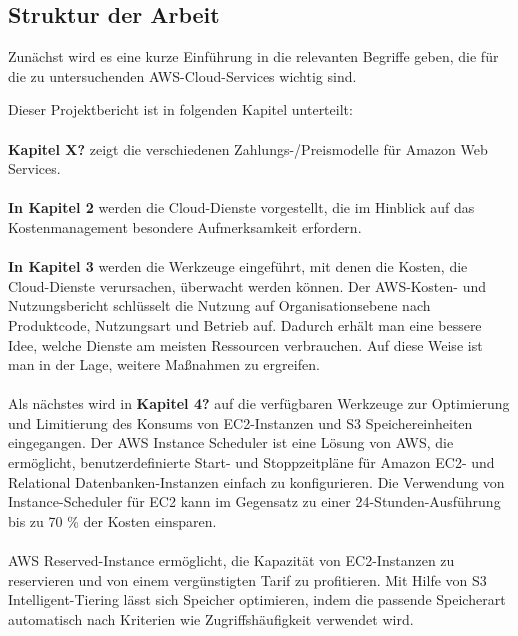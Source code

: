 \subsection{Struktur der Arbeit}
Zunächst wird es eine kurze Einführung in die relevanten Begriffe geben, die für die zu untersuchenden AWS-Cloud-Services wichtig sind.

Dieser Projektbericht ist in folgenden Kapitel unterteilt:\\\\
\textbf{Kapitel X?} 
zeigt die verschiedenen Zahlungs-/Preismodelle für Amazon Web Services. 
\\\\
\textbf{In Kapitel 2} werden die Cloud-Dienste vorgestellt, die im Hinblick auf das Kostenmanagement besondere Aufmerksamkeit erfordern.
\\\\
\textbf{In Kapitel 3} werden die Werkzeuge eingeführt, mit denen die Kosten, die Cloud-Dienste verursachen, überwacht werden können. Der AWS-Kosten- und Nutzungsbericht schlüsselt die Nutzung auf Organisationsebene nach Produktcode, Nutzungsart und Betrieb auf. Dadurch erhält man eine bessere Idee, welche Dienste am meisten Ressourcen verbrauchen. Auf diese Weise ist man in der Lage, weitere Maßnahmen zu ergreifen.
\\\\
Als nächstes wird in \textbf{Kapitel 4?} auf die verfügbaren Werkzeuge zur Optimierung und Limitierung des Konsums von EC2-Instanzen und S3 Speichereinheiten eingegangen. Der AWS Instance Scheduler ist eine Lösung von AWS, die ermöglicht, benutzerdefinierte Start- und Stoppzeitpläne für Amazon EC2- und Relational Datenbanken-Instanzen einfach zu konfigurieren. Die Verwendung von Instance-Scheduler für EC2 kann im Gegensatz zu einer 24-Stunden-Ausführung bis zu 70 \% der Kosten einsparen.
\\\\
AWS Reserved-Instance ermöglicht, die Kapazität von EC2-Instanzen zu reservieren und von einem vergünstigten Tarif zu profitieren. Mit Hilfe von S3 Intelligent-Tiering lässt sich Speicher optimieren, indem die passende Speicherart automatisch nach Kriterien wie Zugriffshäufigkeit verwendet wird.
\\\\
 
